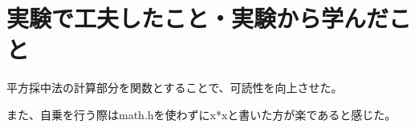 

\section{実験で工夫したこと・実験から学んだこと}
平方採中法の計算部分を関数とすることで、可読性を向上させた。

また、自乗を行う際はmath.hを使わずにx*xと書いた方が楽であると感じた。


